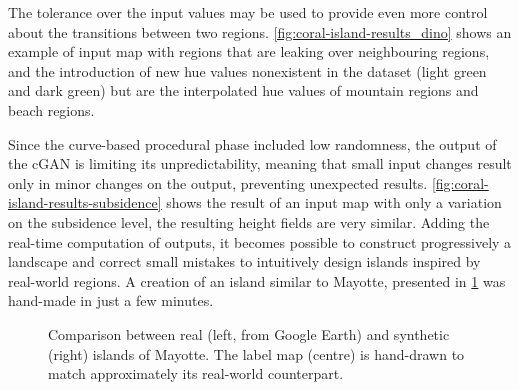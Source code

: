 The tolerance over the input values may be used to provide even more control about the transitions between two regions. \cref{fig:coral-island-results_dino} shows an example of input map with regions that are leaking over neighbouring regions, and the introduction of new hue values nonexistent in the dataset (light green and dark green) but are the interpolated hue values of mountain regions and beach regions.

Since the curve-based procedural phase included low randomness, the output of the cGAN is limiting its unpredictability, meaning that small input changes result only in minor changes on the output, preventing unexpected results. \cref{fig:coral-island-results-subsidence} shows the result of an input map with only a variation on the subsidence level, the resulting height fields are very similar. Adding the real-time computation of outputs, it becomes possible to construct progressively a landscape and correct small mistakes to intuitively design islands inspired by real-world regions. A creation of an island similar to Mayotte, presented in \cref{fig:coral-island-example-Mayotte} was hand-made in just a few minutes.

\begin{figure}
\caption{Comparison between real (left, from Google Earth) and synthetic (right) islands of Mayotte. The label map (centre) is hand-drawn to match approximately its real-world counterpart.}
\label{fig:coral-island-example-Mayotte}
\end{figure}









